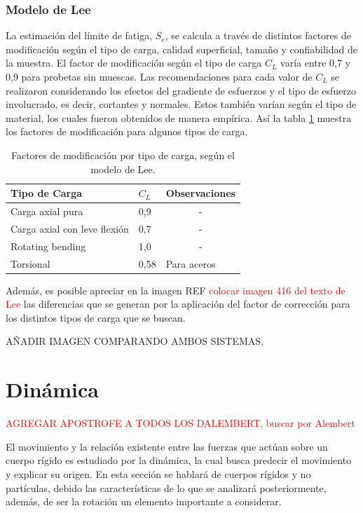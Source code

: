 \subsubsection{Modelo de Lee}
La estimación del límite de fatiga, $S_e$, se calcula a través de distintos factores de modificación según el tipo de carga, calidad superficial, tamaño y confiabilidad de la muestra. El factor de modificación según el tipo de carga $C_L$ varía entre 0,7 y 0,9 para probetas sin muescas. Las recomendaciones para cada valor de $C_L$ se realizaron considerando los efectos del gradiente de esfuerzos y el tipo de esfuerzo involucrado, es decir, cortantes y normales. Estos también varían según el tipo de material, los cuales fueron obtenidos de manera empírica. Así la tabla \ref{tab:lee_factor} muestra los factores de modificación para algunos tipos de carga.

\begin{table}[h]
\centering
\caption{Factores de modificación por tipo de carga, según el modelo de Lee.}
\label{tab:lee_factor}
\begin{tabular}{@{}llc@{}}
\toprule
Tipo de Carga                & $C_L$ & \multicolumn{1}{l}{Observaciones} \\ \midrule
Carga axial pura             & 0,9   & -                                 \\
Carga axial con leve flexión & 0,7   & -                                 \\
Rotating bending             & 1,0   & -                                 \\
Torsional                    & 0,58  & \multicolumn{1}{l}{Para aceros}   \\ \bottomrule
\end{tabular}
\end{table}

Además, es posible apreciar en la imagen REF \textcolor{red}{colocar imagen 416 del texto de Lee} las diferencias que se generan por la aplicación del factor de corrección para los distintos tipos de carga que se buscan. 

AÑADIR IMAGEN COMPARANDO AMBOS SISTEMAS.

\section{Dinámica}
\textcolor{red}{AGREGAR APOSTROFE A TODOS LOS DALEMBERT, buscar por Alembert}

El movimiento y la relación existente entre las fuerzas que actúan sobre un cuerpo rígido es estudiado por la dinámica, la cual busca predecir el movimiento y explicar su origen. En esta sección se hablará de cuerpos rígidos y no partículas, debido las características de lo que se analizará posteriormente, además, de ser la rotación un elemento importante a considerar. 
